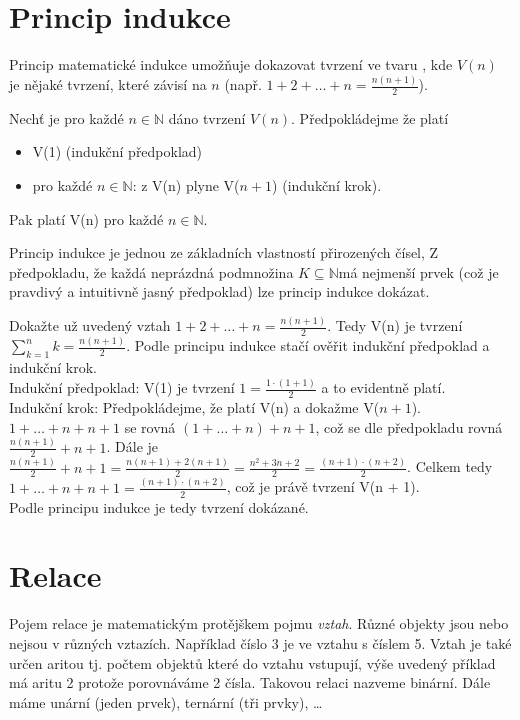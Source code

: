 \section{Princip indukce}
Princip matematické indukce umožňuje dokazovat tvrzení ve tvaru , kde $V(n)$ je nějaké tvrzení, které závisí na $n$ (např. $1 + 2 + \dots + n = \frac{n(n+1)}{2}$).

\begin{sentence}
	Nechť je pro každé $n \in \mathbb{N}$ dáno tvrzení $V(n)$. Předpokládejme že platí
	\begin{itemize}
		\item V(1) (indukční předpoklad)
		\item pro každé $n \in \mathbb{N}$: z V(n) plyne V($n+1$) (indukční krok).
	\end{itemize}
	Pak platí V(n) pro každé $n \in \mathbb{N}$.
\end{sentence}

Princip indukce je jednou ze základních vlastností přirozených čísel, Z předpokladu, že každá neprázdná podmnožina $K \subseteq \mathbb{N}$má nejmenší prvek (což je pravdivý a intuitivně jasný předpoklad) lze princip indukce dokázat.

\begin{example}
	Dokažte už uvedený vztah $1 + 2 + \dots + n = \frac{n(n+1)}{2}$. Tedy V(n) je tvrzení $\sum^n_{k=1} k =  \frac{n(n+1)}{2}$. Podle principu indukce stačí ověřit indukční předpoklad a indukční krok. \\[6pt]
	Indukční předpoklad: V(1) je tvrzení $1 = \frac{1 \cdot (1 + 1)}{2}$ a to evidentně platí.\\[6pt]
	Indukční krok: Předpokládejme, že platí V(n) a dokažme V($n + 1$). $1 + \dots + n + n + 1$ se rovná  $(1 + \dots + n) + n + 1$, což se dle předpokladu rovná $\frac{n(n + 1)}{2} + n + 1$. Dále je $\frac{n(n + 1)}{2} + n + 1 = \frac{n(n + 1) + 2(n + 1)}{2} = \frac{n^2 + 3n + 2}{2} = \frac{(n + 1) \cdot (n + 2)}{2}$. Celkem tedy $1 + \dots + n + n + 1 =  \frac{(n + 1) \cdot (n + 2)}{2}$, což je právě tvrzení V(n + 1).\\[6pt]
	Podle principu indukce je tedy tvrzení dokázané.
\end{example}

\section{Relace}
Pojem relace je matematickým protějškem pojmu \textit{vztah}. Různé objekty jsou nebo nejsou v různých vztazích. Například číslo 3 je ve vztahu  s číslem 5. Vztah je také určen aritou tj. počtem objektů které do vztahu vstupují, výše uvedený příklad má aritu 2 protože porovnáváme 2 čísla. Takovou relaci nazveme binární. Dále máme unární (jeden prvek), ternární (tři prvky), \dots

